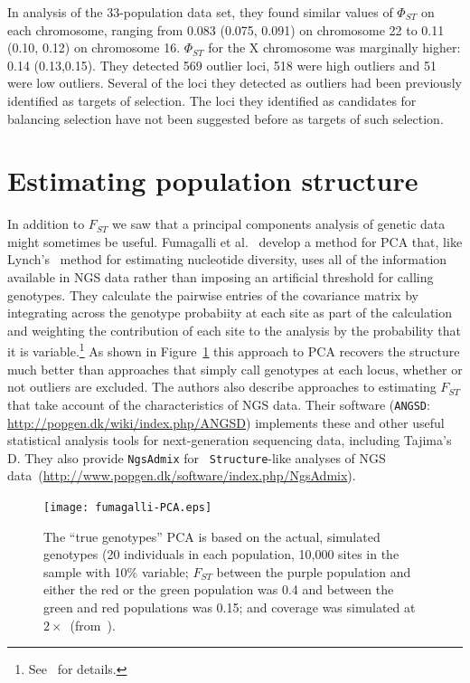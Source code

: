 In analysis of the 33-population data set, they found similar values
of $\Phi_{ST}$ on each chromosome, ranging from 0.083 (0.075, 0.091)
on chromosome 22 to 0.11 (0.10, 0.12) on chromosome 16. $\Phi_{ST}$
for the X chromosome was marginally higher: 0.14 (0.13,0.15). They
detected 569 outlier loci, 518 were high outliers and 51 were low
outliers. Several of the loci they detected as outliers had been
previously identified as targets of selection. The loci they
identified as candidates for balancing selection have not been
suggested before as targets of such selection.

\section*{Estimating population structure}

In addition to $F_{ST}$ we saw that a principal components analysis of
genetic data might sometimes be useful. Fumagalli et
al.~\cite{Fumagalli-etal-2013} develop a method for PCA that, like
Lynch's~\cite{Lynch-2008} method for estimating nucleotide diversity,
uses all of the information available in NGS data rather than imposing
an artificial threshold for calling genotypes. They calculate the
pairwise entries of the covariance matrix by integrating across the
genotype probabiity at each site as part of the calculation and
weighting the contribution of each site to the analysis by the
probability that it is
variable.\footnote{See~\cite{Fumagalli-etal-2013} for details.} As
shown in Figure~\ref{fig:Fumagalli-PCA} this approach to PCA recovers
the structure much better than approaches that simply call genotypes
at each locus, whether or not outliers are excluded. The authors also
describe approaches to estimating $F_{ST}$ that take account of the
characteristics of NGS data. Their software ({\tt ANGSD}:
\url{http://popgen.dk/wiki/index.php/ANGSD}) implements these and
other useful statistical analysis tools for next-generation sequencing
data, including Tajima's D. They also provide {\tt NgsAdmix} for {\tt
  Structure}-like analyses of NGS
data~(\url{http://www.popgen.dk/software/index.php/NgsAdmix}). 

\begin{figure}
\begin{center}
\texttt{[image: fumagalli-PCA.eps]}
\end{center}
\caption{The ``true genotypes'' PCA is based on the actual, simulated
  genotypes (20 individuals in each population, 10,000 sites in the
  sample with 10\% variable; $F_{ST}$ between the purple population
  and either the red or the green population was 0.4 and between the
  green and red populations was 0.15; and coverage was simulated at
  $2\times$~(from~\cite{Fumagalli-etal-2013}).}\label{fig:Fumagalli-PCA}
\end{figure}

